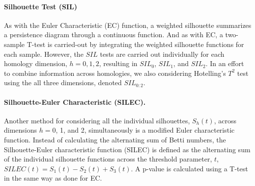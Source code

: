 \documentclass[12pt]{article}
\begin{document}
\begin{figure}[htbp]
   \label{fig:examples}
\end{figure}


\paragraph{Silhouette Test (SIL)}
As with the Euler Characteristic (EC) function, a weighted silhouette summarizes a persistence diagram through a continuous function. And as with EC, a two-sample T-test is carried-out by integrating the weighted silhouette functions for each sample.  However, the $SIL$ tests are carried out individually for each homology dimension, $h = 0, 1, 2$, resulting in $SIL_0$, $SIL_1$, and $SIL_2$. In an effort to combine information across homologies, we also considering Hotelling's $T^2$ test using the all three dimensions, denoted $SIL_{0:2}$.



\paragraph{Silhouette-Euler Characteristic (SILEC).}
Another method for considering all the individual silhouettes, $S_{h}(t)$, across dimensions $h = 0$, 1, and 2, simultaneously is a modified Euler characteristic function. Instead of calculating the alternating sum of Betti numbers, the Silhouette-Euler characteristic function (SILEC) is defined as the alternating sum of the individual silhouette functions across the threshold parameter, $t$, $SILEC(t) =  S_{1}(t) - S_{2}(t) + S_{3}(t)$.
A p-value is calculated using a T-test in the same way as done for EC.
\end{document}
